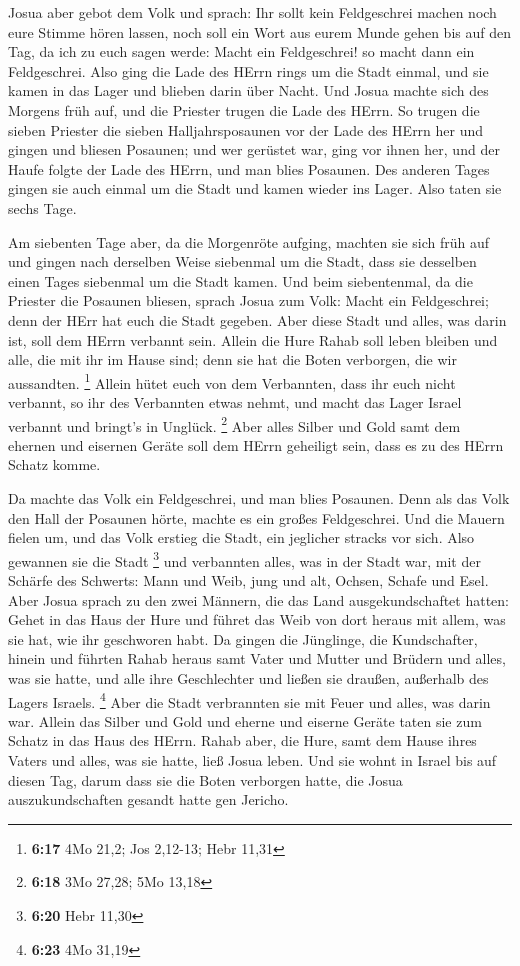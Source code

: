  Josua aber gebot dem Volk und sprach: Ihr sollt kein
Feldgeschrei machen noch eure Stimme hören lassen, noch soll ein Wort
aus eurem Munde gehen bis auf den Tag, da ich zu euch sagen werde: Macht
ein Feldgeschrei! so macht dann ein Feldgeschrei.  Also
ging die Lade des HErrn rings um die Stadt einmal, und sie kamen in das
Lager und blieben darin über Nacht.  Und Josua machte sich
des Morgens früh auf, und die Priester trugen die Lade des HErrn.
 So trugen die sieben Priester die sieben Halljahrsposaunen
vor der Lade des HErrn her und gingen und bliesen Posaunen; und wer
gerüstet war, ging vor ihnen her, und der Haufe folgte der Lade des
HErrn, und man blies Posaunen.  Des anderen Tages gingen
sie auch einmal um die Stadt und kamen wieder ins Lager. Also taten sie
sechs Tage.

 Am siebenten Tage aber, da die Morgenröte aufging, machten
sie sich früh auf und gingen nach derselben Weise siebenmal um die
Stadt, dass sie desselben einen Tages siebenmal um die Stadt kamen.
 Und beim siebentenmal, da die Priester die Posaunen
bliesen, sprach Josua zum Volk: Macht ein Feldgeschrei; denn der HErr
hat euch die Stadt gegeben.  Aber diese Stadt und alles,
was darin ist, soll dem HErrn verbannt sein. Allein die Hure Rahab soll
leben bleiben und alle, die mit ihr im Hause sind; denn sie hat die
Boten verborgen, die wir aussandten. \footnote{\textbf{6:17} 4Mo 21,2;
  Jos 2,12-13; Hebr 11,31}  Allein hütet euch von dem
Verbannten, dass ihr euch nicht verbannt, so ihr des Verbannten etwas
nehmt, und macht das Lager Israel verbannt und bringt's in Unglück.
\footnote{\textbf{6:18} 3Mo 27,28; 5Mo 13,18}  Aber alles
Silber und Gold samt dem ehernen und eisernen Geräte soll dem HErrn
geheiligt sein, dass es zu des HErrn Schatz komme.

 Da machte das Volk ein Feldgeschrei, und man blies
Posaunen. Denn als das Volk den Hall der Posaunen hörte, machte es ein
großes Feldgeschrei. Und die Mauern fielen um, und das Volk erstieg die
Stadt, ein jeglicher stracks vor sich. Also gewannen sie die Stadt
\footnote{\textbf{6:20} Hebr 11,30}  und verbannten alles,
was in der Stadt war, mit der Schärfe des Schwerts: Mann und Weib, jung
und alt, Ochsen, Schafe und Esel.  Aber Josua sprach zu den
zwei Männern, die das Land ausgekundschaftet hatten: Gehet in das Haus
der Hure und führet das Weib von dort heraus mit allem, was sie hat, wie
ihr geschworen habt.  Da gingen die Jünglinge, die
Kundschafter, hinein und führten Rahab heraus samt Vater und Mutter und
Brüdern und alles, was sie hatte, und alle ihre Geschlechter und ließen
sie draußen, außerhalb des Lagers Israels. \footnote{\textbf{6:23} 4Mo
  31,19}  Aber die Stadt verbrannten sie mit Feuer und
alles, was darin war. Allein das Silber und Gold und eherne und eiserne
Geräte taten sie zum Schatz in das Haus des HErrn.  Rahab
aber, die Hure, samt dem Hause ihres Vaters und alles, was sie hatte,
ließ Josua leben. Und sie wohnt in Israel bis auf diesen Tag, darum dass
sie die Boten verborgen hatte, die Josua auszukundschaften gesandt hatte
gen Jericho.

